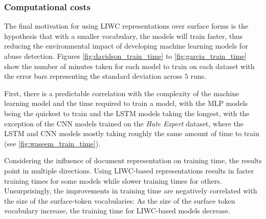 \subsubsection{Computational costs}

The final motivation for using LIWC representations over surface forms is the hypothesis that with a smaller vocabulary, the models will train faster, thus reducing the environmental impact of developing machine learning models for abuse detection. Figures \ref{fig:davidson_train_time} to \ref{fig:garcia_train_time} show the number of minutes taken for each model to train on each dataset with the error bars representing the standard deviation across $5$ runs.

First, there is a predictable correlation with the complexity of the machine learning model and the time required to train a model, with the MLP models being the quickest to train and the LSTM models taking the longest, with the exception of the CNN models trained on the \textit{Hate Expert} dataset, where the LSTM and CNN models mostly taking roughly the same amount of time to train (see \cref{fig:waseem_train_time}).

Considering the influence of document representation on training time, the results point in multiple directions. Using LIWC-based representations results in faster training times for some models while slower training times for others. Unsurprisingly, the improvements in training time are negatively correlated with the size of the surface-token vocabularies: As the size of the surface token vocabulary increase, the training time for LIWC-based models decrease. 

